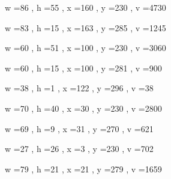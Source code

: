 \documentclass[11pt]{article}
\begin{document}
w =86 , h =55 , x =160 , y =230 , v =4730
\par
w =83 , h =15 , x =163 , y =285 , v =1245
\par
w =60 , h =51 , x =100 , y =230 , v =3060
\par
w =60 , h =15 , x =100 , y =281 , v =900
\par
w =38 , h =1 , x =122 , y =296 , v =38
\par
w =70 , h =40 , x =30 , y =230 , v =2800
\par
w =69 , h =9 , x =31 , y =270 , v =621
\par
w =27 , h =26 , x =3 , y =230 , v =702
\par
w =79 , h =21 , x =21 , y =279 , v =1659
\par
\newpage
\end{document}
